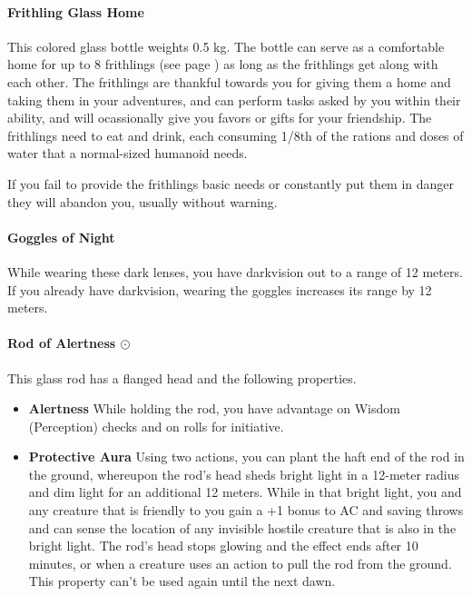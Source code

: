 \paragraph{Frithling Glass Home} %
    This colored glass bottle weights 0.5 kg.
    The bottle can serve as a comfortable home for up to 8 frithlings (see page \pageref{creature::frithling}) as long as the frithlings get along with each other.
    The frithlings are thankful towards you for giving them a home and taking them in your adventures, and can perform tasks asked by you within their ability, and will ocassionally give you favors or gifts for your friendship.
    The frithlings need to eat and drink, each consuming 1/8th of the rations and doses of water that a normal-sized humanoid needs.

    If you fail to provide the frithlings basic needs or constantly put them in danger they will abandon you, usually without warning.
\paragraph{Goggles of Night}
    While wearing these dark lenses, you have darkvision out to a range of 12 meters.
    If you already have darkvision, wearing the goggles increases its range by 12 meters.
\paragraph{Rod of Alertness $\odot$}
    This glass rod has a flanged head and the following properties.
    \begin{itemize}
        \item \textbf{Alertness}
        While holding the rod, you have advantage on Wisdom (Perception) checks and on rolls for initiative.
        \item \textbf{Protective Aura} Using two actions, you can plant the haft end of the rod in the ground, whereupon the rod's head sheds bright light in a 12-meter radius and dim light for an additional 12 meters.
        While in that bright light, you and any creature that is friendly to you gain a +1 bonus to AC and saving throws and can sense the location of any invisible hostile creature that is also in the bright light.
        The rod's head stops glowing and the effect ends after 10 minutes, or when a creature uses an action to pull the rod from the ground.
        This property can't be used again until the next dawn.
    \end{itemize}
